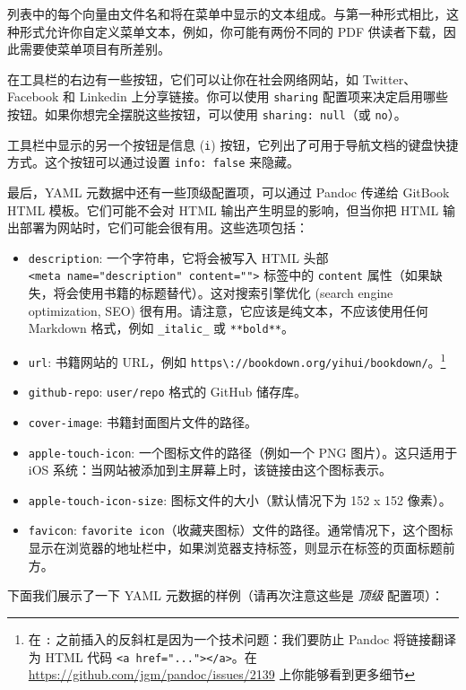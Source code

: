 \documentclass[
  12pt,
]{krantz}
\providecommand{\tightlist}{%
  \setlength{\itemsep}{0pt}\setlength{\parskip}{0pt}}
\theoremstyle{definition}
\theoremstyle{definition}
\theoremstyle{definition}
\theoremstyle{definition}
\theoremstyle{remark}
\begin{document}
列表中的每个向量由文件名和将在菜单中显示的文本组成。与第一种形式相比，这种形式允许你自定义菜单文本，例如，你可能有两份不同的 PDF 供读者下载，因此需要使菜单项目有所差别。

在工具栏的右边有一些按钮，它们可以让你在社会网络网站，如 Twitter、Facebook 和 Linkedin 上分享链接。你可以使用 \texttt{sharing} 配置项来决定启用哪些按钮。如果你想完全摆脱这些按钮，可以使用 \texttt{sharing:\ null}（或 \texttt{no}）。

工具栏中显示的另一个按钮是信息 (\texttt{i}) 按钮，它列出了可用于导航文档的键盘快捷方式。这个按钮可以通过设置 \texttt{info:\ false} 来隐藏。

最后，YAML 元数据中还有一些顶级配置项，可以通过 Pandoc 传递给 GitBook HTML 模板。它们可能不会对 HTML 输出产生明显的影响，但当你把 HTML 输出部署为网站时，它们可能会很有用。这些选项包括：

\begin{itemize}
\tightlist
\item
  \texttt{description}: 一个字符串，它将会被写入 HTML 头部 \texttt{\textless{}meta\ name="description"\ content=""\textgreater{}} 标签中的 \texttt{content} 属性（如果缺失，将会使用书籍的标题替代）。这对搜索引擎优化 (search engine optimization, SEO) 很有用。请注意，它应该是纯文本，不应该使用任何 Markdown 格式，例如 \texttt{\_italic\_} 或 \texttt{**bold**}。
\item
  \texttt{url}: 书籍网站的 URL，例如 \texttt{https\textbackslash{}://bookdown.org/yihui/bookdown/}。\footnote{在 \texttt{:} 之前插入的反斜杠是因为一个技术问题：我们要防止 Pandoc 将链接翻译为 HTML 代码 \texttt{\textless{}a\ href="..."\textgreater{}\textless{}/a\textgreater{}}。在 \url{https://github.com/jgm/pandoc/issues/2139} 上你能够看到更多细节}
\item
  \texttt{github-repo}: \texttt{user/repo} 格式的 GitHub 储存库。
\item
  \texttt{cover-image}: 书籍封面图片文件的路径。
\item
  \texttt{apple-touch-icon}: 一个图标文件的路径（例如一个 PNG 图片）。这只适用于 iOS 系统：当网站被添加到主屏幕上时，该链接由这个图标表示。
\item
  \texttt{apple-touch-icon-size}: 图标文件的大小（默认情况下为 152 x 152 像素）。
\item
  \texttt{favicon}: \texttt{favorite\ icon}（收藏夹图标）文件的路径。通常情况下，这个图标显示在浏览器的地址栏中，如果浏览器支持标签，则显示在标签的页面标题前方。
\end{itemize}

下面我们展示了一下 YAML 元数据的样例（请再次注意这些是 \emph{顶级} 配置项）：
\end{document}
